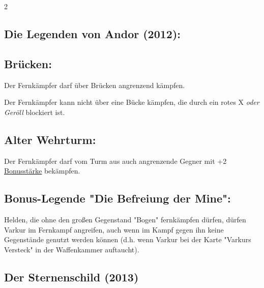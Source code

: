 \documentclass[10pt, a4paper, oneside]{book}
\newcommand{\fan}[1]{\textit{#1}}
\begin{document}
\begin{multicols*}{2}
\begin{nobgcolor}
\end{nobgcolor}






\begin{bgcolor}
\section{Die Legenden von Andor (2012):}





\subsection{Brücken:}

Der Fernkämpfer darf über Brücken angrenzend kämpfen.
\supercite{38688}

Der Fernkämpfer kann nicht über eine Bücke kämpfen, die durch ein rotes X \fan{oder Geröll} blockiert ist.


\subsection{Alter Wehrturm:}

Der Fernkämpfer darf vom Turm aus auch angrenzende Gegner mit +2 \hyperref[Bonusstärke]{Bonusstärke} bekämpfen.
\supercite{DLvA3:Solo,DLvA5:Turm}




\subsection{Bonus-Legende "Die Befreiung der Mine":}

Helden, die ohne den großen Gegenstand "Bogen" fernkämpfen dürfen, dürfen Varkur im Fernkampf angreifen, auch wenn im Kampf gegen ihn keine Gegenstände genutzt werden können (d.h. wenn Varkur bei der Karte "Varkurs Versteck" in der Waffenkammer auftaucht).
\supercite{BL_BdM:Versteck}



\end{bgcolor}






\begin{bgcolor}
\section{Der Sternenschild (2013)}


\end{bgcolor}
\end{multicols*}
\end{document}
